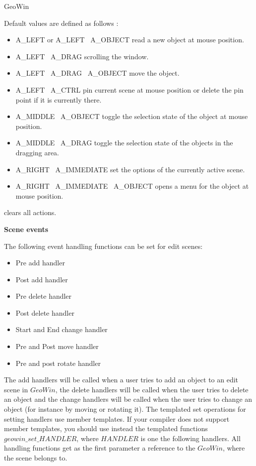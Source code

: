 \begin{ccRefClass}{GeoWin}
\begin{ccAdvanced}
    \medskip
    Default values are defined as follows :
    \begin{itemize}
    \item A\_LEFT   or   A\_LEFT \vline\ A\_OBJECT \newline
    read a new object at mouse position.
    \item A\_LEFT \vline\ A\_DRAG    \newline       scrolling the window.
    \item A\_LEFT \vline\ A\_DRAG \vline\ A\_OBJECT \newline move the object.
    \item A\_LEFT \vline\ A\_CTRL 
    \newline pin current scene at mouse position or delete the pin point if 
    it is currently there. 
    \item A\_MIDDLE \vline\  A\_OBJECT \newline
    toggle the selection state of the object at mouse position.
    \item A\_MIDDLE \vline\ A\_DRAG  
    \newline  toggle the selection state of the objects in the dragging area.
    \item A\_RIGHT \vline\  A\_IMMEDIATE \newline
    set the options of the currently active scene.
    \item A\_RIGHT \vline\  A\_IMMEDIATE \vline\  A\_OBJECT \newline
    opens a menu for the object at mouse position.
    \end{itemize}

{clears all actions. }

{ \medskip
 {\bf Scene events}
     
The following event handling functions can be set for
edit scenes:
\begin{itemize}
\item Pre add handler
\item Post add handler
\item Pre delete handler
\item Post delete handler
\item Start and End change handler
\item Pre and Post move handler
\item Pre and post rotate handler
\end{itemize}
     
The add handlers will be called when a user tries to add an object
to an edit scene in $GeoWin$, the delete handlers will be called when
the user tries to delete an object and the change handlers will be
called when the user tries to change an object (for instance by moving 
or rotating it).
The templated set operations for setting handlers use member templates. 
If your compiler does not support member templates, you should use instead
the templated functions $geowin\_set\_HANDLER$, where $HANDLER$ is one the
following handlers. 
All handling functions get as the first parameter a reference to the 
$GeoWin$, where the scene belongs to.         
}


\end{ccAdvanced}
\end{ccRefClass}

